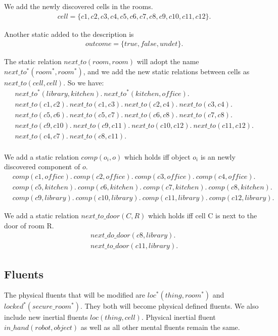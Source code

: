 \documentclass[11pt, oneside]{article}
\begin{document}
We add the newly discovered cells in the rooms. 
 \begin{align*}
  &cell = \{c1, c2, c3, c4, c5, c6, c7, c8, c9, c10, c11, c12\}.
\end{align*}

 Another static added to the description is
 \begin{align*}
  &outcome = \{true, false, undet\}.
\end{align*}

The static relation $next\_to(room, room)$ will adopt the name $next\_to^*(room^*, room^*)$, and we add the new static relations between cells as $next\_to(cell, cell)$. So we have:
\begin{align*}
&next\_to^*(library, kitchen).\ next\_to^*(kitchen, office).\\
 & next\_to(c1,c2).\ next\_to(c1,c3).\ next\_to(c2,c4).\ next\_to(c3,c4).\\
 &next\_to(c5,c6).\ next\_to(c5,c7).\ next\_to(c6,c8).\ next\_to(c7,c8).\\
 &next\_to(c9,c10).\ next\_to(c9,c11).\ next\_to(c10,c12).\ next\_to(c11,c12).\\
 &next\_to(c4,c7).\ next\_to(c8,c11).\\
\end{align*}

We add a static relation $comp(o_i, o)$ which holds iff object $o_i$ is an newly discovered component of $o$.
\begin{align*}
&comp(c1, office).\ comp(c2, office).\ comp(c3, office).\ comp(c4, office).\\
&comp(c5, kitchen).\ comp(c6, kitchen).\ comp(c7, kitchen).\ comp(c8, kitchen).\\
&comp(c9, library).\ comp(c10, library).\ comp(c11, library).\ comp(c12, library).
\end{align*}

We add a static relation $next\_to\_door(C, R)$ which holds iff cell C is next to the door of room R.
\begin{align*}
&next\_do\_door(c8, library).\\
&next\_to\_door(c11, library).
\end{align*}



\subsection{Fluents}
The physical fluents that will be modified are $loc^*(thing, room^*)$ and $locked^*(secure\_room^*)$. They both will become physical defined fluents.  We also include new inertial fluents $loc(thing,cell)$. Physical inertial fluent $in\_hand(robot,object)$ as well as all other mental fluents remain the same.
\end{document}
